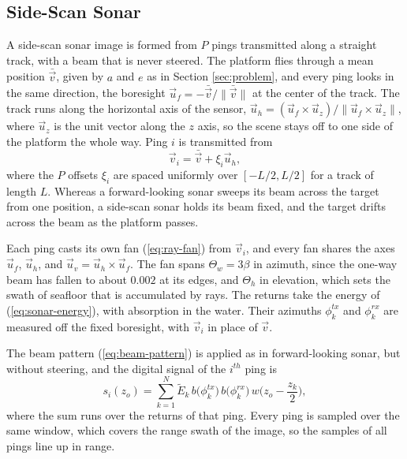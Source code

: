 \documentclass[sensors,article,submit,moreauthors]{Definitions/mdpi}
\begin{document}
\subsection{Side-Scan Sonar}
\label{sec:side-scan}

A side-scan sonar image is formed from $P$ pings transmitted along a straight
track, with a beam
that is never steered. The platform flies through a mean position
$\bar{\vec{v}}$, given by $a$
and $e$ as in Section \ref{sec:problem}, and every ping looks in the same
direction, the boresight
$\vec{u}_f = -\bar{\vec{v}}/\lVert\bar{\vec{v}}\rVert$ at the center of the
track. The track runs
along the horizontal axis of the sensor, $\vec{u}_h = (\vec{u}_f \times
\vec{u}_z)/\lVert\vec{u}_f
\times \vec{u}_z\rVert$, where $\vec{u}_z$ is the unit vector along the $z$
axis, so the scene
stays off to one side of the platform the whole way. Ping $i$ is transmitted
from
\begin{equation}
    \vec{v}_i = \bar{\vec{v}} + \xi_i\vec{u}_h
    ,
    \label{eq:ss-track}
\end{equation}
where the $P$ offsets $\xi_i$ are spaced uniformly over $[-L/2,L/2]$ for a track
of length $L$.
Whereas a forward-looking sonar sweeps its beam across the target from one
position, a side-scan
sonar holds its beam fixed, and the target drifts across the beam as the
platform passes.

Each ping casts its own fan (\ref{eq:ray-fan}) from $\vec{v}_i$, and every fan
shares the axes
$\vec{u}_f$, $\vec{u}_h$, and $\vec{u}_v = \vec{u}_h \times \vec{u}_f$. The fan
spans $\Theta_w =
3\beta$ in azimuth, since the one-way beam has fallen to about $0.002$ at its
edges, and
$\Theta_h$ in elevation, which sets the swath of seafloor that is accumulated by
rays. The returns take the
energy of (\ref{eq:sonar-energy}), with absorption in the water. Their azimuths
$\phi^{tx}_k$ and $\phi^{rx}_k$ are measured off the fixed boresight,
with $\vec{v}_i$ in place of $\vec{v}$.

The beam pattern (\ref{eq:beam-pattern}) is applied as in forward-looking sonar,
but without
steering, and the digital signal of the $i^{th}$ ping is
\begin{equation}
    s_i(z_o) =
    \sum_{k=1}^{N}\tilde{E}_k\,b\big(\phi^{tx}_k\big)\,b\big(\phi^{rx}_k\big)\,%
    w\bigg(z_o-\frac{z_k}{2}\bigg)
    ,
    \label{eq:ss-signal}
\end{equation}
where the sum runs over the returns of that ping. Every ping is sampled over the
same window, which covers the range swath of the image, so the
samples of all pings line up in range.
\end{document}
